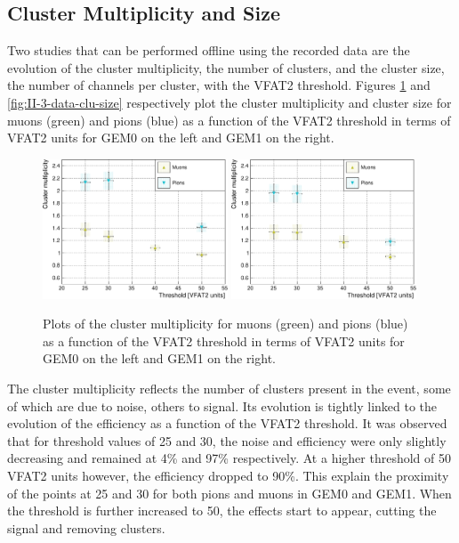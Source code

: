     \subsection{Cluster Multiplicity and Size}

      Two studies that can be performed offline using the recorded data are the evolution of the cluster multiplicity, the number of clusters, and the cluster size, the number of channels per cluster, with the VFAT2 threshold. Figures \ref{fig:II-3-data-clu-mult} and \ref{fig:II-3-data-clu-size} respectively plot the cluster multiplicity and cluster size for muons (green) and pions (blue) as a function of the VFAT2 threshold in terms of VFAT2 units for GEM0 on the left and GEM1 on the right. \\

      \begin{figure}[h!]
        \centering
        \includegraphics[width=0.49\textwidth]{img/plots/cClusterMultiplicity_Threshold_GEM0-crop}
        \includegraphics[width=0.49\textwidth]{img/plots/cClusterMultiplicity_Threshold_GEM1-crop}
        \caption{Plots of the cluster multiplicity for muons (green) and pions (blue) as a function of the VFAT2 threshold in terms of VFAT2 units for GEM0 on the left and GEM1 on the right.}
        \label{fig:II-3-data-clu-mult}
      \end{figure}

      The cluster multiplicity reflects the number of clusters present in the event, some of which are due to noise, others to signal. Its evolution is tightly linked to the evolution of the efficiency as a function of the VFAT2 threshold. It was observed that for threshold values of 25 and 30, the noise and efficiency were only slightly decreasing and remained at 4\% and 97\% respectively. At a higher threshold of 50 VFAT2 units however, the efficiency dropped to 90\%. This explain the proximity of the points at 25 and 30 for both pions and muons in GEM0 and GEM1. When the threshold is further increased to 50, the effects start to appear, cutting the signal and removing clusters. \\

